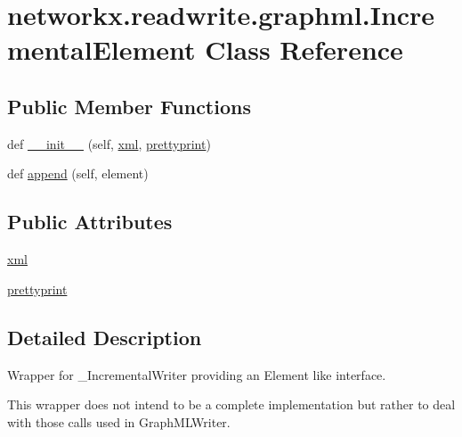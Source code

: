 \hypertarget{classnetworkx_1_1readwrite_1_1graphml_1_1IncrementalElement}{}\section{networkx.\+readwrite.\+graphml.\+Incremental\+Element Class Reference}
\label{classnetworkx_1_1readwrite_1_1graphml_1_1IncrementalElement}
\subsection*{Public Member Functions}
\begin{DoxyCompactItemize}
\item 
def \hyperlink{classnetworkx_1_1readwrite_1_1graphml_1_1IncrementalElement_a1e90fa0c7f1e54462d96213c2f6578cf}{\+\_\+\+\_\+init\+\_\+\+\_\+} (self, \hyperlink{classnetworkx_1_1readwrite_1_1graphml_1_1IncrementalElement_aebb62e1217e8c324ca1e8f537bd27355}{xml}, \hyperlink{classnetworkx_1_1readwrite_1_1graphml_1_1IncrementalElement_a4b2cf795ec4ba6d14f996d185b2f2c3e}{prettyprint})
\item 
def \hyperlink{classnetworkx_1_1readwrite_1_1graphml_1_1IncrementalElement_a7da77073284981b27985698461ad2de4}{append} (self, element)
\end{DoxyCompactItemize}
\subsection*{Public Attributes}
\begin{DoxyCompactItemize}
\item 
\hyperlink{classnetworkx_1_1readwrite_1_1graphml_1_1IncrementalElement_aebb62e1217e8c324ca1e8f537bd27355}{xml}
\item 
\hyperlink{classnetworkx_1_1readwrite_1_1graphml_1_1IncrementalElement_a4b2cf795ec4ba6d14f996d185b2f2c3e}{prettyprint}
\end{DoxyCompactItemize}


\subsection{Detailed Description}
\begin{DoxyVerb}Wrapper for _IncrementalWriter providing an Element like interface.

This wrapper does not intend to be a complete implementation but rather to
deal with those calls used in GraphMLWriter.
\end{DoxyVerb}
 

